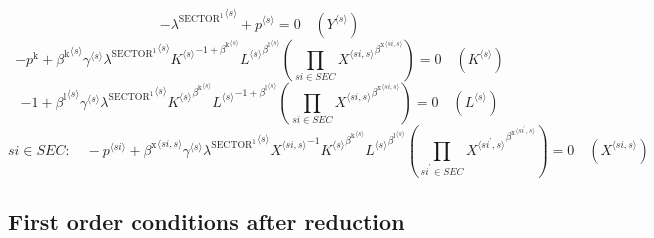 \begin{equation}
-{\lambda^{\mathrm{SECTOR}^{\mathrm{1}}}}^{\langle s\rangle} + {p}^{\langle s\rangle} = 0
 \quad \left({Y}^{\langle s\rangle}\right)
\end{equation}
\begin{equation}
-p^{\mathrm{k}} + {{\beta^{\mathrm{k}}}^{\langle s\rangle}} {{\gamma}^{\langle s\rangle}} {{\lambda^{\mathrm{SECTOR}^{\mathrm{1}}}}^{\langle s\rangle}} {{{K}^{\langle s\rangle}}^{-1 + {\beta^{\mathrm{k}}}^{\langle s\rangle}}} {{{L}^{\langle s\rangle}}^{{\beta^{\mathrm{l}}}^{\langle s\rangle}}} \left(\prod_{{s\!i}\in {S\!E\!C}} {{X}^{\langle {s\!i},s\rangle}}^{{\beta^{\mathrm{x}}}^{\langle {s\!i},s\rangle}}\right) = 0
 \quad \left({K}^{\langle s\rangle}\right)
\end{equation}
\begin{equation}
-1 + {{\beta^{\mathrm{l}}}^{\langle s\rangle}} {{\gamma}^{\langle s\rangle}} {{\lambda^{\mathrm{SECTOR}^{\mathrm{1}}}}^{\langle s\rangle}} {{{K}^{\langle s\rangle}}^{{\beta^{\mathrm{k}}}^{\langle s\rangle}}} {{{L}^{\langle s\rangle}}^{-1 + {\beta^{\mathrm{l}}}^{\langle s\rangle}}} \left(\prod_{{s\!i}\in {S\!E\!C}} {{X}^{\langle {s\!i},s\rangle}}^{{\beta^{\mathrm{x}}}^{\langle {s\!i},s\rangle}}\right) = 0
 \quad \left({L}^{\langle s\rangle}\right)
\end{equation}
\begin{equation}
{s\!i}\in {S\!E\!C}\colon\quad -{p}^{\langle {s\!i}\rangle} + {{\beta^{\mathrm{x}}}^{\langle {s\!i},s\rangle}} {{\gamma}^{\langle s\rangle}} {{\lambda^{\mathrm{SECTOR}^{\mathrm{1}}}}^{\langle s\rangle}} {{X}^{\langle {s\!i},s\rangle}}^{-1} {{{K}^{\langle s\rangle}}^{{\beta^{\mathrm{k}}}^{\langle s\rangle}}} {{{L}^{\langle s\rangle}}^{{\beta^{\mathrm{l}}}^{\langle s\rangle}}} \left(\prod_{{s\!i}^{\prime}\in {S\!E\!C}} {{X}^{\langle {s\!i}^{\prime},s\rangle}}^{{\beta^{\mathrm{x}}}^{\langle {s\!i}^{\prime},s\rangle}}\right) = 0
 \quad \left({X}^{\langle {s\!i},s\rangle}\right)
\end{equation}


\subsection{First order conditions after reduction}

